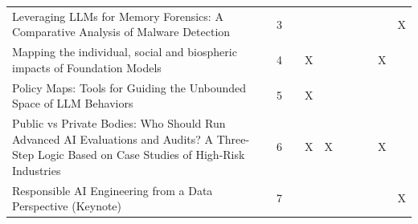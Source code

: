 \begin{landscape}
\begin{longtable}{|p{14cm}|c|c|c|c|c|c|c|c|c|}
		Leveraging LLMs for Memory Forensics: A Comparative Analysis of Malware Detection                                                                       & 3           &                                    &                                                           &                                                       &                                                            &                                           &                                              &                                                    & X                                  \\
		Mapping the individual, social and biospheric impacts of Foundation Models                                                                              & 4           &                                    & X                                                         &                                                       &                                                            &                                           &                                              & X                                                  &                                    \\
		Policy Maps: Tools for Guiding the Unbounded Space of LLM Behaviors                                                                                     & 5           &                                    & X                                                         &                                                       &                                                            &                                           &                                              &                                                    &                                    \\
		Public vs Private Bodies: Who Should Run Advanced AI Evaluations and Audits? A Three-Step Logic Based on Case Studies of High-Risk Industries           & 6           &                                    & X                                                         & X                                                     &                                                            &                                           &                                              & X                                                  &                                    \\
		Responsible AI Engineering from a Data Perspective (Keynote)                                                                                            & 7           &                                    &                                                           &                                                       &                                                            &                                           &                                              &                                                    & X                                  \\

\end{longtable}
\end{landscape}
